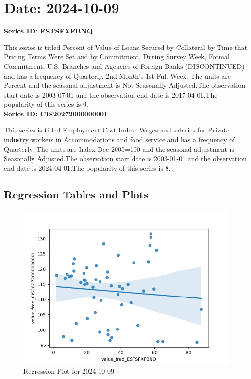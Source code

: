 \section{Date: 2024-10-09}
\noindent \textbf{Series ID: ESTSFXFBNQ} 

\noindent This series is titled Percent of Value of Loans Secured by Collateral by Time that Pricing Terms Were Set and by Commitment, During Survey Week, Formal Commitment, U.S. Branches and Agencies of Foreign Banks (DISCONTINUED) and has a frequency of Quarterly, 2nd Month's 1st Full Week. The units are Percent and the seasonal adjustment is Not Seasonally Adjusted.The observation start date is 2003-07-01 and the observation end date is 2017-04-01.The popularity of this series is 0. \\ 

\noindent \textbf{Series ID: CIS2027200000000I} 

\noindent This series is titled Employment Cost Index: Wages and salaries for Private industry workers in Accommodations and food service and has a frequency of Quarterly. The units are Index Dec 2005=100 and the seasonal adjustment is Seasonally Adjusted.The observation start date is 2003-01-01 and the observation end date is 2024-04-01.The popularity of this series is 8. \\ 

\subsection{Regression Tables and Plots}


\begin{figure}
\centering
\includegraphics[scale = 0.9]{plots/plot_2024-10-09.png}
\caption{Regression Plot for 2024-10-09}
\end{figure}
\newpage
